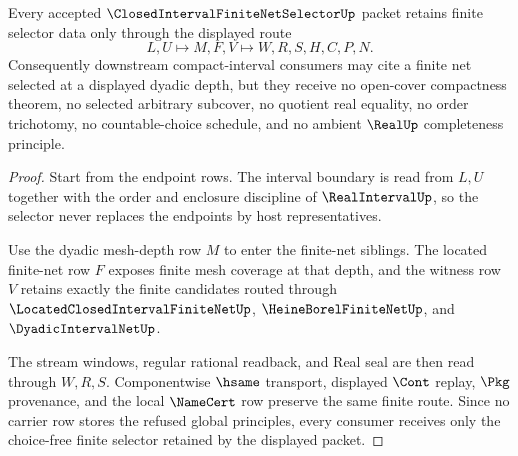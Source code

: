 \begin{theorem}
\label{thm:closed-interval-finite-net-selector-choice-free-retention}
Every accepted $\ClosedIntervalFiniteNetSelectorUp$ packet retains finite selector data only through the displayed route
$$
L,U \longmapsto M,F,V \longmapsto W,R,S,H,C,P,N .
$$
Consequently downstream compact-interval consumers may cite a finite net selected at a displayed dyadic depth, but they receive no open-cover compactness theorem, no selected arbitrary subcover, no quotient real equality, no order trichotomy, no countable-choice schedule, and no ambient $\RealUp$ completeness principle.
\end{theorem}
\begin{proof}
Start from the endpoint rows. The interval boundary is read from $L,U$ together with the order and enclosure discipline of $\RealIntervalUp$, so the selector never replaces the endpoints by host representatives.

Use the dyadic mesh-depth row $M$ to enter the finite-net siblings. The located finite-net row $F$ exposes finite mesh coverage at that depth, and the witness row $V$ retains exactly the finite candidates routed through $\LocatedClosedIntervalFiniteNetUp$, $\HeineBorelFiniteNetUp$, and $\DyadicIntervalNetUp$.

The stream windows, regular rational readback, and Real seal are then read through $W,R,S$. Componentwise $\hsame$ transport, displayed $\Cont$ replay, $\Pkg$ provenance, and the local $\NameCert$ row preserve the same finite route. Since no carrier row stores the refused global principles, every consumer receives only the choice-free finite selector retained by the displayed packet.
\end{proof}


\begin{closurestatus}{\ClosedIntervalFiniteNetSelectorUp}
  \theoryclosure{\seedClosure}
  \formalstatus{\unformalizedV}
\end{closurestatus}

